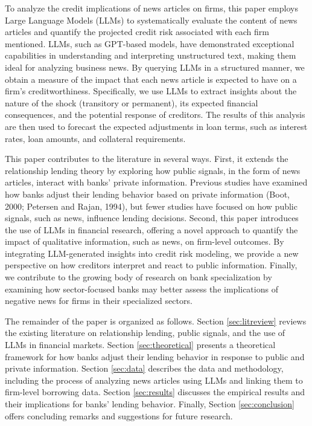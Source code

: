 To analyze the credit implications of news articles on firms, this paper employs Large Language Models (LLMs) to systematically evaluate the content of news articles and quantify the projected credit risk associated with each firm mentioned. LLMs, such as GPT-based models, have demonstrated exceptional capabilities in understanding and interpreting unstructured text, making them ideal for analyzing business news. By querying LLMs in a structured manner, we obtain a measure of the impact that each news article is expected to have on a firm's creditworthiness. Specifically, we use LLMs to extract insights about the nature of the shock (transitory or permanent), its expected financial consequences, and the potential response of creditors. The results of this analysis are then used to forecast the expected adjustments in loan terms, such as interest rates, loan amounts, and collateral requirements.

This paper contributes to the literature in several ways. First, it extends the relationship lending theory by exploring how public signals, in the form of news articles, interact with banks' private information. Previous studies have examined how banks adjust their lending behavior based on private information (Boot, 2000; Petersen and Rajan, 1994), but fewer studies have focused on how public signals, such as news, influence lending decisions. Second, this paper introduces the use of LLMs in financial research, offering a novel approach to quantify the impact of qualitative information, such as news, on firm-level outcomes. By integrating LLM-generated insights into credit risk modeling, we provide a new perspective on how creditors interpret and react to public information. Finally, we contribute to the growing body of research on bank specialization by examining how sector-focused banks may better assess the implications of negative news for firms in their specialized sectors.

The remainder of the paper is organized as follows. Section \ref{sec:litreview} reviews the existing literature on relationship lending, public signals, and the use of LLMs in financial markets. Section \ref{sec:theoretical} presents a theoretical framework for how banks adjust their lending behavior in response to public and private information. Section \ref{sec:data} describes the data and methodology, including the process of analyzing news articles using LLMs and linking them to firm-level borrowing data. Section \ref{sec:results} discusses the empirical results and their implications for banks' lending behavior. Finally, Section \ref{sec:conclusion} offers concluding remarks and suggestions for future research.


